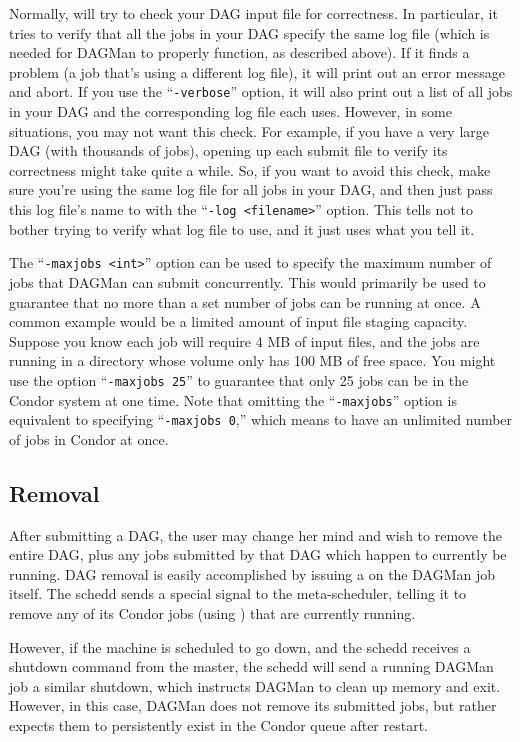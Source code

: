 Normally,  will try to check your DAG input file
for correctness.
In particular, it tries to verify that all the jobs in your DAG
specify the same log file (which is needed for DAGMan to properly
function, as described above).
If it finds a problem (a job that's using a different log file), it
will print out an error message and abort.
If you use the ``{\tt -verbose}'' option, it will also print out a list of
all jobs in your DAG and the corresponding log file each uses.
However, in some situations, you may not want this check.
For example, if you have a very large DAG (with thousands of jobs),
opening up each submit file to verify its correctness might take quite
a while.
So, if you want to avoid this check, make sure you're using the same
log file for all jobs in your DAG, and then just pass this log file's
name to  with the ``{\tt -log <filename>}'' option.
This tells  not to bother trying to verify what
log file to use, and it just uses what you tell it.

The ``{\tt -maxjobs <int>}'' option can be used to specify the maximum number
of jobs that DAGMan can submit concurrently.  This would primarily be used to
guarantee that no more than a set number of jobs can be running at once.  A
common example would be a limited amount of input file staging capacity.
Suppose you know each job will require 4 MB of input files, and the jobs are
running in a directory whose volume only has 100 MB of free space.  You might
use the option ``{\tt -maxjobs 25}'' to guarantee that only 25 jobs can be in
the Condor system at one time.  Note that omitting the ``{\tt -maxjobs}''
option is equivalent to specifying ``{\tt -maxjobs 0},'' which means to have
an unlimited number of jobs in Condor at once.

\subsection{Removal}

After submitting a DAG, the user may change her mind and wish to remove the
entire DAG, plus any jobs submitted by that DAG which happen to currently be
running.  DAG removal is easily accomplished by issuing a  on the
DAGMan job itself.  The schedd sends a special signal to the meta-scheduler,
telling it to remove any of its Condor jobs (using ) that are
currently running.

However, if the machine is scheduled to go down, and the schedd receives a
shutdown command from the master, the schedd will send a running DAGMan job a
similar shutdown, which instructs DAGMan to clean up memory and exit.
However, in this case, DAGMan does not remove its submitted jobs, but rather
expects them to persistently exist in the Condor queue after restart.

